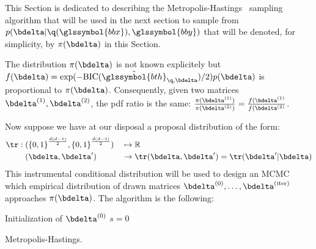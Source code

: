 This Section is dedicated to describing the Metropolis-Hastings~\cite{hastings1970monte} sampling algorithm that will be used in the next section to sample from $p(\bdelta | \q(\glssymbol{bbx}),\glssymbol{bby})$ that will be denoted, for simplicity, by $\pi(\bdelta)$ in this Section.

The distribution $\pi(\bdelta)$ is not known explicitely but $f(\bdelta) = \exp(-\text{BIC}(\hat{\glssymbol{bth}}_{\q,\bdelta})/2) p(\bdelta)$ is proportional to $\pi(\bdelta)$. Consequently, given two matrices $\bdelta^{(1)},\bdelta^{(2)}$, the \gls{pdf} ratio is the same: $\frac{\pi(\bdelta^{(1)})}{\pi(\bdelta^{(2)})} = \frac{f(\bdelta^{(1)}}{f(\bdelta^{(2)}}$.

Now suppose we have at our disposal a proposal distribution of the form:
\begin{alignat}{2}
\tr: \; & ({\{0,1\}}^{\frac{d(d-1)}{2}},{\{0,1\}}^{\frac{d(d-1)}{2}}) && \mapsto \mathbb{R} \nonumber \\ 
& (\bdelta,\bdelta') && \to \tr(\bdelta,\bdelta') = \tr(\bdelta' | \bdelta) \nonumber
\end{alignat}
This instrumental conditional distribution will be used to design an MCMC which empirical distribution of drawn matrices $\bdelta^{(0)}, \dots, \bdelta^{(\text{iter})}$ approaches $\pi(\bdelta)$. The algorithm is the following:

\begin{algorithm}[H]
 Initialization of $ \bdelta^{(0)} $\;
 $s = 0$\;
\caption{\label{metropolis} Metropolis-Hastings.}
\end{algorithm}

